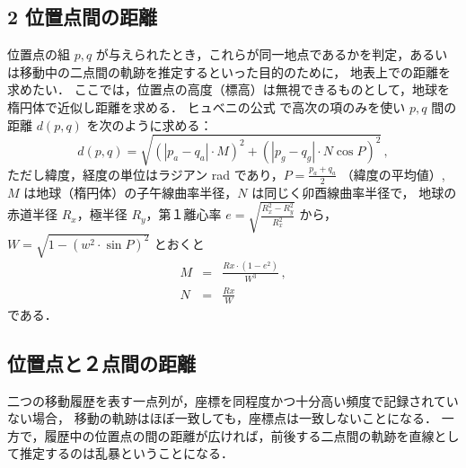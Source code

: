 \documentclass[11pt]{jarticle}
\begin{document}
\subsection{2 位置点間の距離}
位置点の組 $p, q$ が与えられたとき，これらが同一地点であるかを判定，あるいは移動中の二点間の軌跡を推定するといった目的のために，
地表上での距離を求めたい．
ここでは，位置点の高度（標高）は無視できるものとして，地球を楕円体で近似し距離を求める．
ヒュベニの公式 \cite{amano-tec,GSI,Hubeny-formula-ref1,Hubeny-formula-ref2} で高次の項のみを使い $p, q$ 間の距離 $d(p,q)$ を次のように求める：
\[
d(p,q) = \sqrt{(|p_a - q_a|\cdot M)^2 + \left(|p_g - q_g|\cdot N\cos{P} \right)^2} \,,
\]
ただし緯度，経度の単位はラジアン rad であり，$P = \frac{p_a+q_a}{2}$ （緯度の平均値）, $M$ は地球（楕円体）の子午線曲率半径，$N$ は同じく卯酉線曲率半径で，
地球の赤道半径 $R_x$，極半径 $R_y$，第１離心率 $e=\sqrt{\frac{R_x^2 - R_y^2}{R_x^2}}$ から，$W = \sqrt{1 - (w^2 \cdot \sin P)^2}$ とおくと
\begin{eqnarray*}
M &=& \frac{Rx\cdot (1 - e^2)}{W^3} \,, \\
N &=& \frac{Rx}{W}
\end{eqnarray*}
である．

\subsection{位置点と２点間の距離}

二つの移動履歴を表す一点列が，座標を同程度かつ十分高い頻度で記録されていない場合，
移動の軌跡はほぼ一致しても，座標点は一致しないことになる．
一方で，履歴中の位置点の間の距離が広ければ，前後する二点間の軌跡を直線として推定するのは乱暴ということになる．
\end{document}
